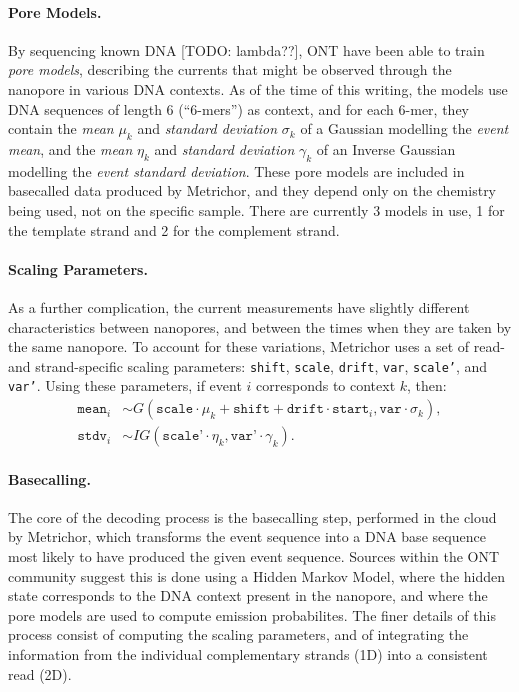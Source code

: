 \documentclass{bioinfo}
\begin{document}
\paragraph{Pore Models.}
By sequencing known DNA [TODO: lambda??], ONT have been able to train \emph{pore models}, describing the currents that might be observed through the nanopore in various DNA contexts. As of the time of this writing, the models use DNA sequences of length 6 (``6-mers'') as context, and for each 6-mer, they contain the \emph{mean} $\mu_k$ and \emph{standard deviation} $\sigma_k$ of a Gaussian modelling the \emph{event mean}, and the \emph{mean} $\eta_k$ and \emph{standard deviation} $\gamma_k$ of an Inverse Gaussian modelling the \emph{event standard deviation}. These pore models are included in basecalled data produced by Metrichor, and they depend only on the chemistry being used, not on the specific sample. There are currently 3 models in use, 1 for the template strand and 2 for the complement strand.

\paragraph{Scaling Parameters.}
As a further complication, the current measurements have slightly different characteristics between nanopores, and between the times when they are taken by the same nanopore. To account for these variations, Metrichor uses a set of read- and strand-specific scaling parameters: \texttt{shift}, \texttt{scale}, \texttt{drift}, \texttt{var}, \texttt{scale'}, and \texttt{var'}. Using these parameters, if event $i$ corresponds to context $k$, then:
\begin{align*}
\texttt{mean}_i & \sim
G(\texttt{scale} \cdot \mu_k + \texttt{shift} + \texttt{drift} \cdot \texttt{start}_i,
\texttt{var} \cdot \sigma_k), \\
\texttt{stdv}_i & \sim
IG(\texttt{scale'} \cdot \eta_k,
\texttt{var'} \cdot \gamma_k).
\end{align*}

\paragraph{Basecalling.}
The core of the decoding process is the basecalling step, performed in the cloud by Metrichor, which transforms the event sequence into a DNA base sequence most likely to have produced the given event sequence. Sources within the ONT community suggest this is done using a Hidden Markov Model, where the hidden state corresponds to the DNA context present in the nanopore, and where the pore models are used to compute emission probabilites. The finer details of this process consist of computing the scaling parameters, and of integrating the information from the individual complementary strands (1D) into a consistent read (2D).
\end{document}
